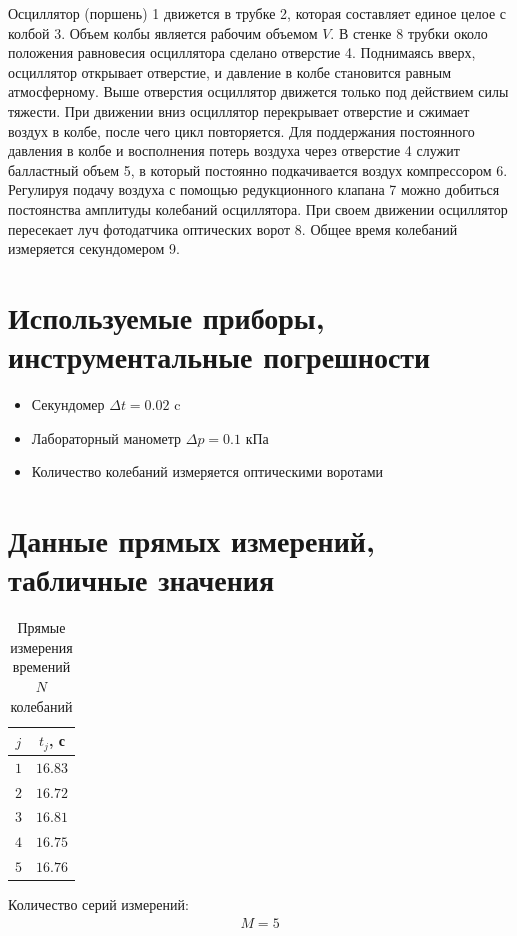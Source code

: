 \documentclass{article}
\begin{document}
Осциллятор (поршень) 1 движется в трубке 2, которая составляет единое целое с
колбой 3. Объем колбы является рабочим объемом $V$. В стенке 8
трубки около положения равновесия осциллятора сделано отверстие 4. Поднимаясь вверх, осциллятор открывает отверстие,
и давление в колбе становится равным атмосферному. Выше отверстия
осциллятор движется только под действием силы тяжести.
При движении вниз осциллятор перекрывает отверстие и сжимает воздух в колбе, после чего цикл повторяется.
Для поддержания постоянного давления в колбе и восполнения потерь воздуха через отверстие 4 служит балластный объем 5,
в который постоянно подкачивается воздух компрессором 6. Регулируя подачу воздуха с помощью редукционного клапана 7
можно добиться постоянства амплитуды колебаний осциллятора.
При своем движении осциллятор пересекает луч фотодатчика оптических ворот 8.
Общее время колебаний измеряется секундомером 9.
\section{Используемые приборы, инструментальные погрешности}
\begin{itemize}
    \item Секундомер $\Delta t = 0.02\text{ c}$
    \item Лабораторный манометр $\Delta p = 0.1 \text{ кПа}$
    \item Количество колебаний измеряется оптическими воротами 
\end{itemize}
\section{Данные прямых измерений, табличные значения}
\begin{table}[H]
   \centering
   \caption{Прямые измерения времений $N$ колебаний}
   \begin{tabular}{|c|c|} \hline
       $j$ & $t_{ j}$, с \\ \hline
       $1$ & $16.83$ \\ \hline
       $2$ & $16.72$ \\ \hline
       $3$ & $16.81$ \\ \hline
       $4$ & $16.75$ \\ \hline
       $5$ & $16.76$ \\ \hline
   \end{tabular}
\end{table}

Количество серий измерений:
\begin{gather*}
    M = 5
\end{gather*}
\end{document}
